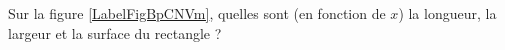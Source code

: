 
\begin{exercice}\label{exoSeconde-0018}

Sur la figure \ref{LabelFigBpCNVm}, quelles sont (en fonction de \( x\)) la longueur, la largeur et la surface du rectangle ?
\newcommand{\CaptionFigBpCNVm}{figure de l'exercice \ref{exoSeconde-0018}} 


\end{exercice}
